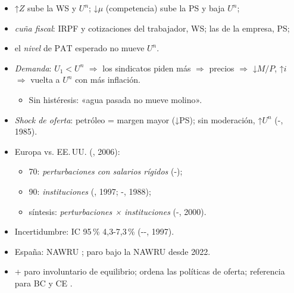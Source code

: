 \documentclass{article}
\begin{document}
\begin{columnas}
\begin{itemize}
  \begin{itemize}
  \item ↑$Z$ sube la WS y $U^n$; ↓$\mu$ (competencia) sube la PS y baja $U^n$;
  \item \emph{cuña fiscal}: IRPF y cotizaciones del trabajador, WS; las de la empresa, PS;
  \item el \emph{nivel} de $\mathrm{PAT}$ esperado no mueve $U^n$.
  \end{itemize}
\end{itemize}
\begin{itemize}
\item \emph{Demanda}: $U_1<U^n$ $\Rightarrow$ los sindicatos piden más $\Rightarrow$ precios $\Rightarrow$ ↓$M/P$, ↑$i$ $\Rightarrow$ vuelta a $U^n$ con más inflación.
  \begin{itemize}
  \item Sin histéresis: «agua pasada no mueve molino».
  \end{itemize}
\item \emph{Shock de oferta}: petróleo = margen mayor (↓PS); sin moderación, ↑$U^n$ (-, 1985).
\end{itemize}
\begin{itemize}
\item Europa vs. EE.\,UU. (, 2006):
  \begin{itemize}
  \item 70: \emph{perturbaciones con salarios rígidos} (-);
  \item 90: \emph{instituciones} (, 1997; -, 1988);
  \item síntesis: \emph{perturbaciones × instituciones} (-, 2000).
  \end{itemize}
\item Incertidumbre: IC 95\,\% 4,3-7,3\,\% (--, 1997).
\item España: NAWRU ; paro bajo la NAWRU desde 2022.
\end{itemize}
\begin{itemize}
\item + paro involuntario de equilibrio; ordena las políticas de oferta; referencia para BC y CE .

\end{itemize}
\end{columnas}
\end{document}
